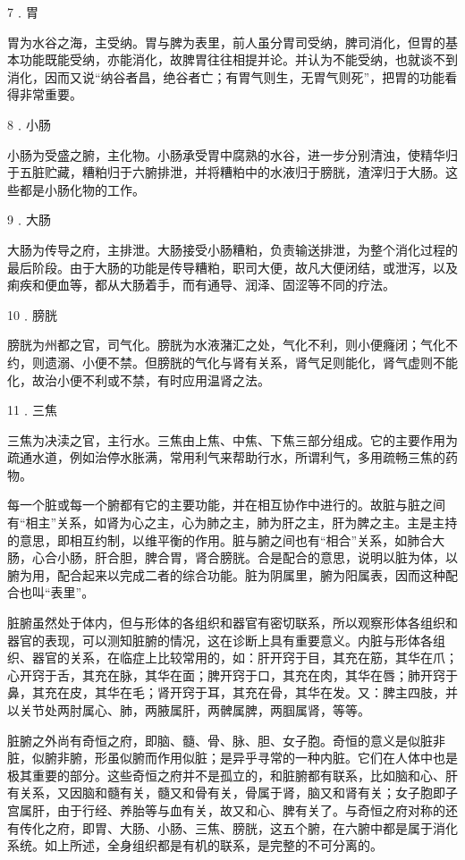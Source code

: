 \documentclass[12pt,UTF8]{ctexbook}
\begin{document}
7﹒胃

胃为水谷之海，主受纳。胃与脾为表里，前人虽分胃司受纳，脾司消化，但胃的基本功能既能受纳，亦能消化，故脾胃往往相提并论。并认为不能受纳，也就谈不到消化，因而又说“纳谷者昌，绝谷者亡；有胃气则生，无胃气则死”，把胃的功能看得非常重要。

8﹒小肠

小肠为受盛之腑，主化物。小肠承受胃中腐熟的水谷，进一步分别清浊，使精华归于五脏贮藏，糟粕归于六腑排泄，并将糟粕中的水液归于膀胱，渣滓归于大肠。这些都是小肠化物的工作。

9﹒大肠

大肠为传导之府，主排泄。大肠接受小肠糟粕，负责输送排泄，为整个消化过程的最后阶段。由于大肠的功能是传导糟粕，职司大便，故凡大便闭结，或泄泻，以及痢疾和便血等，都从大肠着手，而有通导、润泽、固涩等不同的疗法。

10﹒膀胱

膀胱为州都之官，司气化。膀胱为水液潴汇之处，气化不利，则小便癃闭；气化不约，则遗溺、小便不禁。但膀胱的气化与肾有关系，肾气足则能化，肾气虚则不能化，故治小便不利或不禁，有时应用温肾之法。

11﹒三焦

三焦为决渎之官，主行水。三焦由上焦、中焦、下焦三部分组成。它的主要作用为疏通水道，例如治停水胀满，常用利气来帮助行水，所谓利气，多用疏畅三焦的药物。

每一个脏或每一个腑都有它的主要功能，并在相互协作中进行的。故脏与脏之间有“相主”关系，如肾为心之主，心为肺之主，肺为肝之主，肝为脾之主。主是主持的意思，即相互约制，以维平衡的作用。脏与腑之间也有“相合”关系，如肺合大肠，心合小肠，肝合胆，脾合胃，肾合膀胱。合是配合的意思，说明以脏为体，以腑为用，配合起来以完成二者的综合功能。脏为阴属里，腑为阳属表，因而这种配合也叫“表里”。

脏腑虽然处于体内，但与形体的各组织和器官有密切联系，所以观察形体各组织和器官的表现，可以测知脏腑的情况，这在诊断上具有重要意义。内脏与形体各组织、器官的关系，在临症上比较常用的，如：肝开窍于目，其充在筋，其华在爪；心开窍于舌，其充在脉，其华在面；脾开窍于口，其充在肉，其华在唇；肺开窍于鼻，其充在皮，其华在毛；肾开窍于耳，其充在骨，其华在发。又：脾主四肢，并以关节处两肘属心、肺，两腋属肝，两髀属脾，两腘属肾，等等。

脏腑之外尚有奇恒之府，即脑、髓、骨、脉、胆、女子胞。奇恒的意义是似脏非脏，似腑非腑，形虽似腑而作用似脏；是异乎寻常的一种内脏。它们在人体中也是极其重要的部分。这些奇恒之府并不是孤立的，和脏腑都有联系，比如脑和心、肝有关系，又因脑和髓有关，髓又和骨有关，骨属于肾，脑又和肾有关；女子胞即子宫属肝，由于行经、养胎等与血有关，故又和心、脾有关了。与奇恒之府对称的还有传化之府，即胃、大肠、小肠、三焦、膀胱，这五个腑，在六腑中都是属于消化系统。如上所述，全身组织都是有机的联系，是完整的不可分离的。
\end{document}
